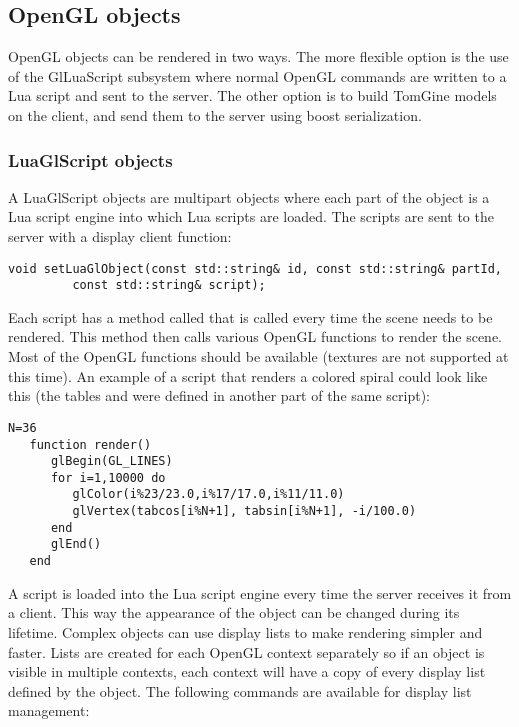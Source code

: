 \subsection{OpenGL objects}

OpenGL objects can be rendered in two ways. The more flexible option is the use
of the GlLuaScript subsystem where normal OpenGL commands are written to a Lua
script and sent to the server. The other option is to build TomGine models on
the client, and send them to the server using boost serialization. 


\subsubsection{LuaGlScript objects}

A LuaGlScript objects are multipart objects where each part of the object is a
Lua script engine into which Lua scripts are loaded. The scripts are sent to
the server with a display client function:

\begin{Verbatim}[fontsize=\scriptsize,gobble=3]
   void setLuaGlObject(const std::string& id, const std::string& partId,
         const std::string& script);
\end{Verbatim}

Each script has a method called  that is called every time the
scene needs to be rendered.  This method then calls various OpenGL functions to
render the scene. Most of the OpenGL functions should be available (textures
are not supported at this time). An example of a script that renders a colored
spiral could look like this (the tables  and  were
defined in another part of the same script):

\begin{Verbatim}[fontsize=\scriptsize,gobble=3]
   N=36
   function render()
      glBegin(GL_LINES)
      for i=1,10000 do
         glColor(i%23/23.0,i%17/17.0,i%11/11.0)
         glVertex(tabcos[i%N+1], tabsin[i%N+1], -i/100.0)
      end
      glEnd()
   end
\end{Verbatim}

A script is loaded into the Lua script engine every time the server receives it
from a client. This way the appearance of the object can be changed during its
lifetime. Complex objects can use display lists to make rendering simpler and 
faster. Lists are created for each OpenGL context separately so if an object
is visible in multiple contexts, each context will have a copy of every
display list defined by the object.
The following commands are available for display list management:

